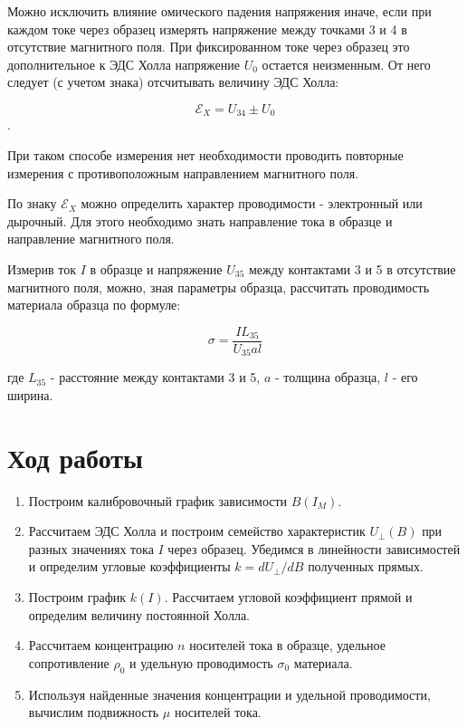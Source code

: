 \documentclass[a4paper]{article}
\theoremstyle{definition}
\theoremstyle{remark}
\begin{document}
  	Можно исключить влияние омического падения напряжения иначе, если при каждом токе через образец измерять напряжение между точками 3 и 4 в отсутствие магнитного поля. При фиксированном токе через образец это дополнительное к ЭДС Холла напряжение $U_{0}$ остается неизменным. От него следует (с учетом
  	знака) отсчитывать величину ЭДС Холла: 
  	
  	$$\mathscr{E}_{X} = U_{34} \pm U_{0}$$. 
  	
  	При таком способе измерения нет необходимости проводить повторные измерения с противоположным направлением магнитного поля.
  	
  	
  	По знаку $\mathscr{E}_{X}$ можно определить характер проводимости - электронный или дырочный. Для этого необходимо знать направление тока в образце и направление
  	магнитного поля.
  	
  	Измерив ток $I$ в образце и напряжение $U_{35}$ между контактами 3 и 5 в отсутствие магнитного поля, можно, зная параметры образца, рассчитать проводимость материала образца по формуле:
  	
  \begin{equation}\label{sigma}
  	\sigma=\dfrac{IL_{35}}{U_{35}al}
  \end{equation}
  	
  	где $L_{35}$ - расстояние между контактами 3 и 5, $a$ - толщина образца, $l$ - его ширина.

\section{Ход работы}

\begin{enumerate}
    \item Построим калибровочный график зависимости $B(I_M)$.
    \item Рассчитаем ЭДС Холла и построим семейство характеристик $U_{\bot}(B)$ при разных значениях тока $I$ через образец. Убедимся в линейности зависимостей и определим угловые коэффициенты $k = dU_{\bot} / dB$ полученных прямых.
    \item Построим график $k(I)$. Рассчитаем угловой коэффициент прямой и определим величину постоянной Холла.
    \item Рассчитаем концентрацию $n$ носителей тока в образце, удельное сопротивление $\rho_0$ и удельную проводимость $\sigma_0$ материала.
    \item Используя найденные значения концентрации и удельной проводимости, вычислим подвижность $\mu$ носителей тока.
\end{enumerate}
\end{document}
